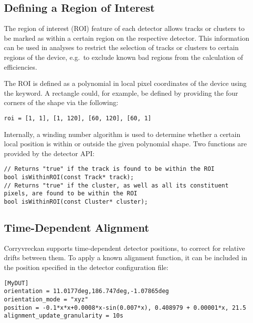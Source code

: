 \subsection{Defining a Region of Interest}
\label{sec:roi}

The region of interest (ROI) feature of each detector allows tracks or clusters to be marked as within a certain region on the respective detector.
This information can be used in analyses to restrict the selection of tracks or clusters to certain regions of the device, e.g.\ to exclude known bad regions from the calculation of efficiencies.

The ROI is defined as a polynomial in local pixel coordinates of the device using the  keyword. A rectangle could, for example, be defined by providing the four corners of the shape via the following:

\begin{verbatim}
roi = [1, 1], [1, 120], [60, 120], [60, 1]
\end{verbatim}

Internally, a winding number algorithm is used to determine whether a certain local position is within or outside the given polynomial shape.
Two functions are provided by the detector API:

\begin{verbatim}
// Returns "true" if the track is found to be within the ROI
bool isWithinROI(const Track* track);
// Returns "true" if the cluster, as well as all its constituent pixels, are found to be within the ROI
bool isWithinROI(const Cluster* cluster);
\end{verbatim}

\subsection{Time-Dependent Alignment}
\label{sec:alignTimeDep}

Corryvreckan supports time-dependent detector positions, to correct for relative drifts between them. To apply a known alignment function, it can be included in the position specified in the detector configuration file:

\begin{verbatim}
[MyDUT]
orientation = 11.0177deg,186.747deg,-1.07865deg
orientation_mode = "xyz"
position = -0.1*x*x+0.0008*x-sin(0.007*x), 0.408979 + 0.00001*x, 21.5
alignment_update_granularity = 10s
\end{verbatim}

